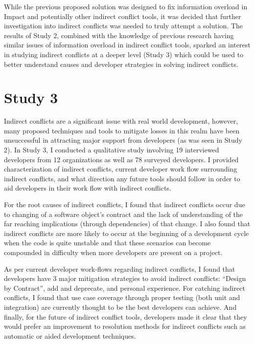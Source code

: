 While the previous proposed solution was designed to fix information overload in Impact and potentially other indirect
conflict tools, it was decided that further investigation into indirect conflicts was needed to truly attempt a solution.
The results of Study 2, combined with the knowledge of previous research having similar issues of information overload
in indirect conflict tools, sparked an interest in studying indirect conflicts at a deeper level (Study 3) which could
be used to better understand causes and developer strategies in solving indirect conflicts.

\section{Study 3}

Indirect conflicts are a significant issue with real world development, however, many proposed techniques and tools to mitigate
losses in this realm have been unsuccessful in attracting major support from developers (as was seen in Study 2). 
In Study 3, I conducted a qualitative study involving
19 interviewed developers from 12 organizations as well as 78 surveyed developers. I provided characterization of indirect conflicts,
current developer work flow surrounding indirect conflicts, and what direction any future tools should follow in order to aid developers
in their work flow with indirect conflicts.

For the root causes of indirect conflicts, I found that indirect conflicts occur due to changing of a software object's 
contract and the lack of understanding of
the far reaching implications (through dependencies) of that change. I also found that indirect conflicts are more likely
to occur at the beginning of a development cycle when the code is quite unstable and that these scenarios can become
compounded in difficulty when more developers are present on a project. 

As per current developer work-flows regarding indirect conflicts, I found that developers have 3 major mitigation strategies
to avoid indirect conflicts: ``Design by Contract'', add and deprecate, and personal experience. For catching indirect conflicts,
I found that use case coverage through proper testing (both unit and integration) are currently thought to be the best
developers can achieve. And finally, for the future of indirect conflict tools, developers made it clear that they would
prefer an improvement to resolution methods for indirect conflicts such as automatic or aided development techniques.

